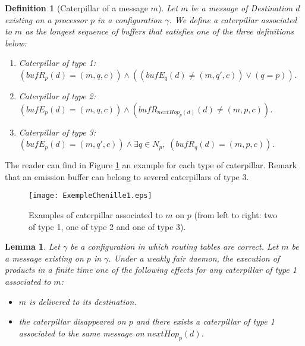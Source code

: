 \documentclass[11pt]{article}
\newtheorem{definition}{Definition}
\newtheorem{lemma}{Lemma}
\begin{document}
\begin{definition} [Caterpillar of a message $m$] \label{def:caterpillarN}
Let $m$ be a message of Destination $d$ existing on a processor $p$ in a configuration $\gamma$. We define a caterpillar associated to $m$ as the longest sequence of buffers that satisfies one of the three definitions below:
\begin{enumerate}
\item Caterpillar of type 1: $(bufR_{p}(d)=(m,q,c))\wedge((bufE_{q}(d)\neq(m,q',c))\vee(q=p))$. 
\item Caterpillar of type 2: $(bufE_{p}(d)=(m,q,c))\wedge(bufR_{nextHop_{p}(d)}(d)\neq(m,p,c))$. 
\item Caterpillar of type 3: $(bufE_{p}(d)=(m,q',c))\wedge\exists q\in N_{p},\;(bufR_{q}(d)=(m,p,c))$. 
\end{enumerate}
\end{definition}

The reader can find in Figure \ref{fig:CaterpillarN} an example for each type of caterpillar. Remark that an emission buffer can belong to several caterpillars of type 3.

\begin{figure}
\begin{centering}
\texttt{[image: ExempleChenille1.eps]}
\par\end{centering}
\caption{\label{fig:CaterpillarN}Examples of caterpillar associated to $m$ on $p$ (from left to right: two of type 1, one of type 2 and one of type 3).}
\end{figure}

\begin{lemma} \label{lem:avanceN}
Let $\gamma$ be a configuration in which routing tables are correct. Let $m$ be a message existing on $p$ in $\gamma$. Under a weakly fair daemon, the execution of \AN products in a finite time one of the following effects for any caterpillar of type 1 associated to $m$:
\begin{itemize}
\item $m$ is delivered to its destination.
\item the caterpillar disappeared on $p$ and there exists a caterpillar of type 1 associated to the same message on $nextHop_{p}(d)$. 
\end{itemize}
\end{lemma}
\end{document}
